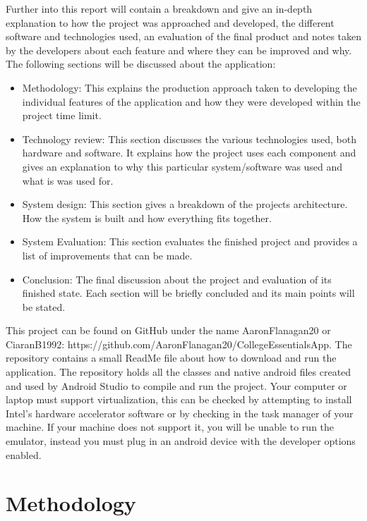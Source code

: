 Further into this report will contain a breakdown and give an in-depth explanation to how the project was approached and developed, the different software and technologies used, an evaluation of the final product and notes taken by the developers about each feature and where they can be improved and why. The following sections will be discussed about the application:
\begin{itemize}
\item Methodology: This explains the production approach taken to developing the individual features of the application and how they were developed within the project time limit.
\item Technology review: This section discusses the various technologies used, both hardware and software. It explains how the project uses each component and gives an explanation to why this particular system/software was used and what is was used for.
\item System design: This section gives a breakdown of the projects architecture. How the system is built and how everything fits together.
\item System Evaluation: This section evaluates the finished project and provides a list of improvements that can be made.
\item Conclusion: The final discussion about the project and evaluation of its finished state. Each section will be briefly concluded and its main points will be stated.
\end{itemize}

This project can be found on GitHub under the name AaronFlanagan20 or CiaranB1992: https://github.com/AaronFlanagan20/CollegeEssentialsApp.
The repository contains a small ReadMe file about how to download and run the application. The repository holds all the classes and native android files created and used by Android Studio to compile and run the project. Your computer or laptop must support virtualization, this can be checked by attempting to install Intel's hardware accelerator software or by checking in the task manager of your machine. If your machine does not support it, you will be unable to run the emulator, instead you must plug in an android device with the developer options enabled.

\chapter{Methodology}
